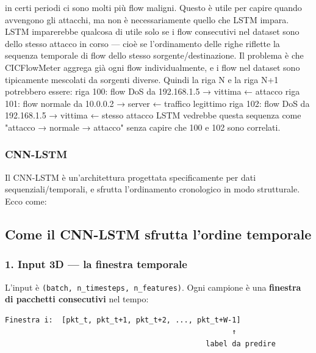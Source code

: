  in certi periodi ci sono molti più flow maligni. Questo è utile per capire quando avvengono gli attacchi, ma non è necessariamente quello che LSTM impara.
LSTM imparerebbe qualcosa di utile solo se i flow consecutivi nel dataset sono dello stesso attacco in corso — cioè se l'ordinamento delle righe riflette la sequenza temporale di flow dello stesso sorgente/destinazione.
Il problema è che CICFlowMeter aggrega già ogni flow individualmente, e i flow nel dataset sono tipicamente mescolati da sorgenti diverse. Quindi la riga N e la riga N+1 potrebbero essere:
riga 100: flow DoS da 192.168.1.5 → vittima    ← attacco
riga 101: flow normale da 10.0.0.2 → server    ← traffico legittimo
riga 102: flow DoS da 192.168.1.5 → vittima    ← stesso attacco
LSTM vedrebbe questa sequenza come "attacco → normale → attacco" senza capire che 100 e 102 sono correlati.

\newpage
\subsubsection{CNN-LSTM}
\label{Chapter: model cnn-lstm}


Il CNN-LSTM è un'architettura progettata specificamente per dati sequenziali/temporali, e sfrutta l'ordinamento cronologico in modo strutturale. Ecco come:

\subsection{Come il CNN-LSTM sfrutta l'ordine temporale}\label{come-il-cnn-lstm-sfrutta-lordine-temporale}

\subsubsection{1. Input 3D --- la finestra temporale}\label{input-3d-la-finestra-temporale}

L'input è \texttt{(batch,\ n\_timesteps,\ n\_features)}. Ogni campione è una \textbf{finestra di pacchetti consecutivi} nel tempo:

\begin{verbatim}
Finestra i:  [pkt_t, pkt_t+1, pkt_t+2, ..., pkt_t+W-1]
                                                    ↑
                                              label da predire
\end{verbatim}

